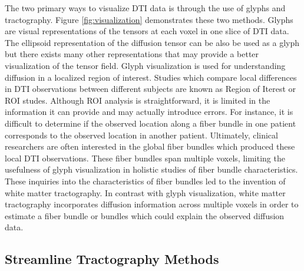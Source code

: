 The two primary ways to visualize DTI data is through the use of glyphs and tractography.  Figure \ref{fig:visualization} demonstrates these two methods.  Glyphs are visual representations of the tensors at each voxel in one slice of DTI data.  The ellipsoid representation of the diffusion tensor can be also be used as a glyph but there exists many other representations that may provide a better visualization of the tensor field.  Glyph visualization is used for understanding diffusion in a localized region of interest.  Studies which compare local differences in DTI observations between different subjects are known as Region of Iterest or ROI studes. Although ROI analysis is straightforward, it is limited in the information it can provide and may actually introduce errors.  For instance, it is difficult to determine if the observed location along a fiber bundle in one patient corresponds to the observed location in another patient.  Ultimately, clinical researchers are often interested in the global fiber bundles which produced these local DTI observations.  These fiber bundles span multiple voxels, limiting the usefulness of glyph visualization in holistic studies of fiber bundle characteristics.  These inquiries into the characteristics of fiber bundles led to the invention of white matter tractography.  In contrast with glyph visualization, white matter tractography incorporates diffusion information across multiple voxels in order to estimate a fiber bundle or bundles which could explain the observed diffusion data.

\subsection{Streamline Tractography Methods}

